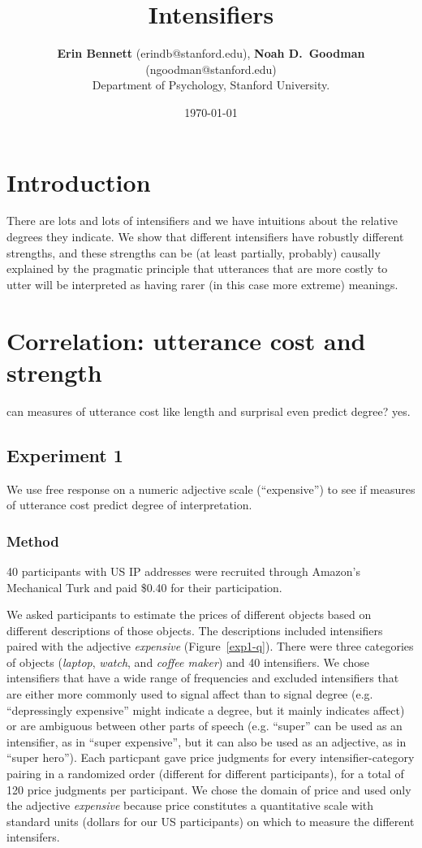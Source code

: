 \documentclass[a4paper,10pt]{article}
\title {\textbf{Intensifiers}}
\author{{\large \bf Erin Bennett} (erindb@stanford.edu), {\large \bf Noah D.~Goodman} (ngoodman@stanford.edu)\\
  Department of Psychology, Stanford University.}
\date {\today}
\newcommand{\w}[1]{\emph{#1}}
\newcommand{\todo}[1]{{\color{red}#1}}
\begin{document}
\setlength{\droptitle}{-2.5cm}
\maketitle

\section{Introduction}
  \todo{There are lots and lots of intensifiers and we have intuitions about the relative degrees they indicate. We show that different intensifiers have robustly different strengths, and these strengths can be (at least partially, probably) causally explained by the pragmatic principle that utterances that are more costly to utter will be interpreted as having rarer (in this case more extreme) meanings.}

\section{Correlation: utterance cost and strength}
  \todo{can measures of utterance cost like length and surprisal even predict degree? yes.}
  
  \subsection{Experiment 1}
    \todo{We use free response on a numeric adjective scale (``expensive'') to see if measures of utterance cost predict degree of interpretation.}

    \subsubsection{Method}
      40 participants with US IP addresses were recruited through Amazon's Mechanical Turk and paid \$0.40 for their participation.

      We asked participants to estimate the prices of different objects based on different descriptions of those objects. The descriptions included intensifiers paired with the adjective \w{expensive} (Figure~\ref{exp1-q}).
      There were three categories of objects (\emph{laptop}, \emph{watch}, and \emph{coffee maker}) and 40 intensifiers.%
      We chose intensifiers that have a wide range of frequencies and excluded intensifiers that are either more commonly used to signal affect than to signal degree (e.g. ``depressingly expensive'' might indicate a degree, but it mainly indicates affect) or are ambiguous between other parts of speech (e.g. ``super'' can be used as an intensifier, as in ``super expensive'', but it can also be used as an adjective, as in ``super hero'').
      Each particpant gave price judgments for every intensifier-category pairing in a randomized order (different for different participants), for a total of 120 price judgments per participant.
      We chose the domain of price and used only the adjective \w{expensive} because price constitutes a quantitative scale with standard units (dollars for our US participants) on which to measure the different intensifers.
\end{document}
